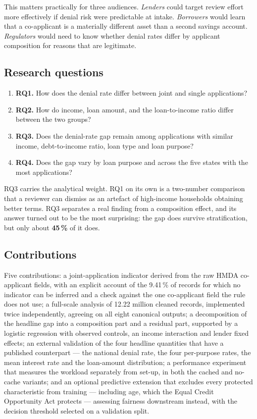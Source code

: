 \documentclass[sigconf,balance=false]{acmart}
\begin{document}
This matters practically for three audiences. \emph{Lenders} could target
review effort more effectively if denial risk were predictable at intake.
\emph{Borrowers} would learn that a co-applicant is a materially different
asset than a second savings account. \emph{Regulators} would need to know
whether denial rates differ by applicant composition for reasons that are
legitimate.

\subsection{Research questions}

\begin{enumerate}
  \item \textbf{RQ1.} How does the denial rate differ between joint and
        single applications?
  \item \textbf{RQ2.} How do income, loan amount, and the loan-to-income
        ratio differ between the two groups?
  \item \textbf{RQ3.} Does the denial-rate gap remain among applications with
        similar income, debt-to-income ratio, loan type and loan purpose?
  \item \textbf{RQ4.} Does the gap vary by loan purpose and across the five
        states with the most applications?
\end{enumerate}

RQ3 carries the analytical weight. RQ1 on its own is a two-number comparison
that a reviewer can dismiss as an artefact of high-income households
obtaining better terms. RQ3 separates a real finding from a composition
effect, and its answer turned out to be the most surprising: the gap does
survive stratification, but only about \textbf{45\,\%} of it does.

\subsection{Contributions}

Five contributions: a joint-application indicator derived from the raw HMDA
co-applicant fields, with an explicit account of the 9.41\,\% of records for
which no indicator can be inferred and a check against the one co-applicant
field the rule does not use; a full-scale analysis of 12.22 million cleaned
records, implemented twice independently, agreeing on all eight canonical
outputs; a decomposition of the headline gap into a composition part and a
residual part, supported by a logistic regression with observed controls, an
income interaction and lender fixed effects; an external validation of the
four headline quantities that have a published counterpart --- the national
denial rate, the four per-purpose rates, the mean interest rate and the
loan-amount distribution; a performance experiment that measures the
workload separately from set-up, in both the cached and no-cache variants;
and an optional predictive extension that excludes every protected
characteristic from training --- including age, which the Equal Credit
Opportunity Act protects --- assessing fairness downstream instead, with the
decision threshold selected on a validation split.
\end{document}
